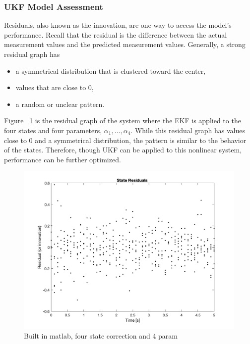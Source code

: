 \clearpage

\subsubsection{UKF Model Assessment }
\noindent Residuals, also known as the innovation, are one way to access the model's performance. Recall that the residual is the difference between the actual measurement values and the predicted measurement values. Generally, a strong residual graph has

\begin{itemize}
\item a symmetrical distribution that is clustered toward the center,
\item values that are close to 0,
\item a random or unclear pattern.
\end{itemize}

\noindent Figure ~\ref{fig:4params} is the residual graph of the system where the EKF is applied to the four states and four parameters, $\alpha_1, \hdots, \alpha_4$. While this residual graph has values close to 0 and a symmetrical distribution, the pattern is similar to the behavior of the states. Therefore, though UKF can be applied to this nonlinear system, performance can be further optimized.

\begin{figure}[h]
    \centering
    \includegraphics[scale = 0.6]{UKF_4param_residual.png}
    \caption{Built in matlab, four state correction and 4 param}
    \label{fig:4params}
\end{figure}

